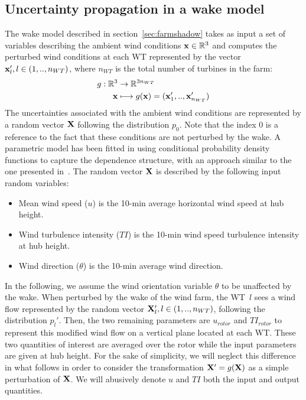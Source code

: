 \subsection{Uncertainty propagation in a wake model}\label{sec:UQ-wake}
The wake model described in section~\ref{sec:farmshadow} takes as input a set of variables describing the ambient wind conditions ${\bf x} \in \mathbb{R}^3$ and computes the perturbed wind conditions at each WT represented by the vector ${\bf x} _l', l \in (1,..,n_{WT})$, where $n_{WT}$ is the total number of turbines in the farm:
\begin{align}
    g:\mathbb{R}^3 &\rightarrow \mathbb{R}^{3 n_{WT}} \\
    {\bf x} &\longmapsto g({\bf x}) = ({\bf x}_1',..,{\bf x}_{n_{WT}}')
\end{align}
The uncertainties associated with the ambient wind conditions are represented by a random vector ${\bf X}$ following the distribution $p_0$. 
Note that the index 0 is a reference to the fact that these conditions are not perturbed by the wake. 
A parametric model has been fitted in \cite{vanem_fekhari_2023} using conditional probability density functions to capture the dependence structure, with an approach similar to the one presented in~\cite{kelly_2022}. 
The random vector ${\bf X}$ is described by the following input random variables:
\begin{itemize}
    \item Mean wind speed ($u$) is the 10-min average horizontal wind speed at hub height.
    \item Wind turbulence intensity ($TI$) is the 10-min wind speed turbulence intensity at hub height.
    \item Wind direction ($\theta$) is the 10-min average wind direction.
\end{itemize}
In the following, we assume the wind orientation variable $\theta$ to be unaffected by the wake. 
When perturbed by the wake of the wind farm, the WT~$l$ sees a wind flow represented by the random vector ${\bf X}_l',l \in (1,..,n_{WT})$, following the distribution $p_l'$. 
Then, the two remaining parameters are $u_{rotor}$ and $TI_{rotor}$ to represent this modified wind flow on a vertical plane located at each WT. 
These two quantities of interest are averaged over the rotor while the input parameters are given at hub height. For the sake of simplicity, we will neglect this difference in what follows in order to consider the transformation ${\bf X}'=g({\bf X})$ as a simple perturbation of ${\bf X}$. We will abusively denote $u$ and $TI$ both the input and output quantities. 
